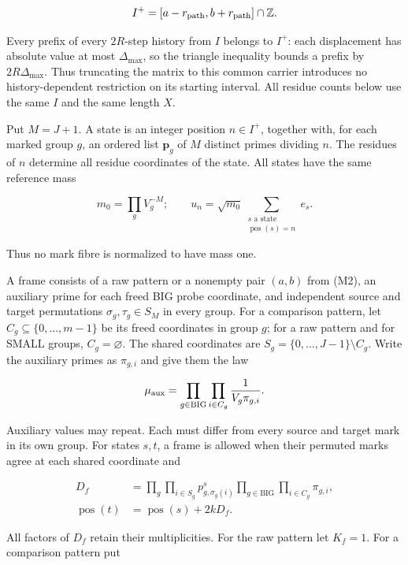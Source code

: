\[
I^+=[a-r_{\rm path},b+r_{\rm path}]\cap\mathbb Z.
\]

Every prefix of every \(2R\)-step history from \(I\) belongs to \(I^+\):
each displacement has absolute value at most \(\Delta_{\max}\), so the
triangle inequality bounds a prefix by \(2R\Delta_{\max}\). Thus
truncating the matrix to this common carrier introduces no
history-dependent restriction on its starting interval. All residue
counts below use the same \(I\) and the same length \(X\).

Put \(M=J+1\). A state is an integer position \(n\in I^+\), together
with, for each marked group \(g\), an ordered list \(\boldsymbol p_g\)
of \(M\) distinct primes dividing \(n\). The residues of \(n\) determine
all residue coordinates of the state. All states have the same reference
mass

\[
m_0=\prod_g V_g^{-M};\qquad
u_n=\sqrt{m_0}\sum_{\substack{s\text{ a state}\\\operatorname{pos}(s)=n}}e_s.
\tag{M18a}
\]

Thus no mark fibre is normalized to have mass one.

A frame consists of a raw pattern or a nonempty pair \((a,b)\) from
(M2), an auxiliary prime for each freed BIG probe coordinate, and
independent source and target permutations \(\sigma_g,\tau_g\in S_M\) in
every group. For a comparison pattern, let
\(C_g\subseteq\{0,\ldots,m-1\}\) be its freed coordinates in group
\(g\); for a raw pattern and for SMALL groups, \(C_g=\varnothing\). The
shared coordinates are \(S_g=\{0,\ldots,J-1\}\setminus C_g\). Write the
auxiliary primes as \(\pi_{g,i}\) and give them the law

\[
\mu_{\rm aux}=\prod_{g\in\mathrm{BIG}}\prod_{i\in C_g}
                 \frac1{V_g\pi_{g,i}}.
\]

Auxiliary values may repeat. Each must differ from every source and
target mark in its own group. For states \(s,t\), a frame is allowed
when their permuted marks agree at each shared coordinate and

\[
\begin{aligned}
D_f&=\prod_g\prod_{i\in S_g}p^s_{g,\sigma_g(i)}
       \prod_{g\in\mathrm{BIG}}\prod_{i\in C_g}\pi_{g,i},\\
\operatorname{pos}(t)&=\operatorname{pos}(s)+2kD_f.
\end{aligned} \tag{M18b}
\]

All factors of \(D_f\) retain their multiplicities. For the raw pattern
let \(K_f=1\). For a comparison pattern put

